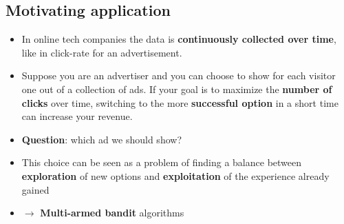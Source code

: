 \documentclass[a0,portrait]{a0poster}
\begin{document}
\begin{multicols}{2}

\color{DarkRed}
\section*{Motivating application}
\color{Black}
\begin{itemize}
    \item[] In online tech companies the data is \textbf{continuously collected over time}, like in click-rate for an advertisement.
    \item[] Suppose you are an advertiser and you can choose to show for each visitor one out of a collection of ads. If your goal is to maximize the \textbf{number of clicks} over time, switching to the more \textbf{successful option} in a short time can increase your revenue.
    \item[] \textbf{Question}: which ad we should show?
    \item[] This choice can be seen as a problem of finding a balance between \textbf{exploration} of new options and \textbf{exploitation} of the experience already gained
    \item[] $\longrightarrow$ \textbf{Multi-armed bandit} algorithms
\end{itemize}



\end{multicols}
\end{document}
